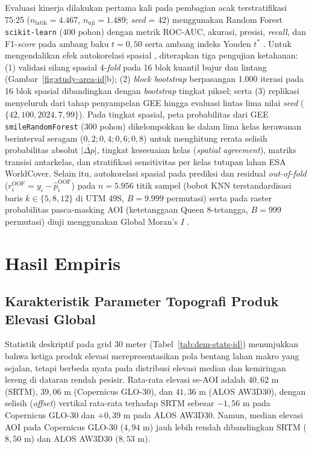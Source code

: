 \documentclass[11pt,twoside]{article}
\begin{document}
Evaluasi kinerja dilakukan pertama kali pada pembagian acak terstratifikasi 75:25 ($n_{\text{latih}}=4.467$, $n_{\text{uji}}=1.489$; \textit{seed} = 42) menggunakan Random Forest \texttt{scikit-learn} (400 pohon) dengan metrik ROC-AUC, akurasi, presisi, \textit{recall}, dan F1-\textit{score} pada ambang baku $t=0{,}50$ serta ambang indeks Youden $t^*$ \cite{youden1950}. Untuk mengendalikan efek autokorelasi spasial \cite{roberts2017,ploton2020}, diterapkan tiga pengujian ketahanan: (1) validasi silang spasial 4-\textit{fold} pada 16 blok kuantil bujur dan lintang (Gambar~\ref{fig:study-area-id}b); (2) \textit{block bootstrap} berpasangan 1.000 iterasi pada 16 blok spasial dibandingkan dengan \textit{bootstrap} tingkat piksel; serta (3) replikasi menyeluruh dari tahap penyampelan GEE hingga evaluasi lintas lima nilai \textit{seed} ($\{42, 100, 2024, 7, 99\}$). Pada tingkat spasial, peta probabilitas dari GEE \texttt{smileRandomForest} (300 pohon) dikelompokkan ke dalam lima kelas kerawanan berinterval seragam ($0{,}2; 0{,}4; 0{,}6; 0{,}8$) untuk menghitung rerata selisih probabilitas absolut $\overline{|\Delta p|}$, tingkat kesesuaian kelas (\textit{spatial agreement}), matriks transisi antarkelas, dan stratifikasi sensitivitas per kelas tutupan lahan ESA WorldCover. Selain itu, autokorelasi spasial pada prediksi dan residual \textit{out-of-fold} ($r_i^{\text{OOF}} = y_i - \hat{p}_i^{\text{OOF}}$) pada $n = 5.956$ titik sampel (bobot KNN terstandardisasi baris $k \in \{5, 8, 12\}$ di UTM 49S, $B = 9.999$ permutasi) serta pada raster probabilitas pasca-masking AOI (ketetanggaan Queen 8-tetangga, $B = 999$ permutasi) diuji menggunakan Global Moran's $I$ \cite{moran1950}.

\section{Hasil Empiris}\label{sec:hasil}

\subsection{Karakteristik Parameter Topografi Produk Elevasi Global}\label{subsec:hasil-dem}

Statistik deskriptif pada grid 30 meter (Tabel~\ref{tab:dem-stats-id}) menunjukkan bahwa ketiga produk elevasi merepresentasikan pola bentang lahan makro yang sejalan, tetapi berbeda nyata pada distribusi elevasi median dan kemiringan lereng di dataran rendah pesisir. Rata-rata elevasi se-AOI adalah $40{,}62\text{ m}$ (SRTM), $39{,}06\text{ m}$ (Copernicus GLO-30), dan $41{,}36\text{ m}$ (ALOS AW3D30), dengan selisih (\textit{offset}) vertikal rata-rata terhadap SRTM sebesar $-1{,}56\text{ m}$ pada Copernicus GLO-30 dan $+0{,}39\text{ m}$ pada ALOS AW3D30. Namun, median elevasi AOI pada Copernicus GLO-30 ($4{,}94\text{ m}$) jauh lebih rendah dibandingkan SRTM ($8{,}50\text{ m}$) dan ALOS AW3D30 ($8{,}53\text{ m}$).
\end{document}
